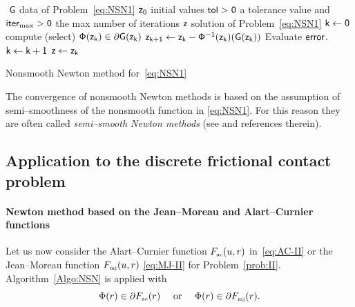 {\begin{algorithm}
  \begin{algorithmic}
    {\sf
      \STATE $ $
      \REQUIRE $\sf G $ data of Problem~\eqref{eq:NSN1}
      \REQUIRE $\sf z_0$ initial values
      \REQUIRE $\sf tol >0$ a tolerance value and $\sf iter_{\max}  >0$ the max number of iterations
      \ENSURE  $\sf z$ solution of Problem~\eqref{eq:NSN1}
      \STATE   $\sf k \leftarrow 0$ 
      \STATE compute (select) $\sf \Phi(z_k) \in \partial G(z_k)$
      \STATE $\sf z_{k+1} \leftarrow   z_k -  \Phi^{-1}(z_k) (G(z_k))$
      \STATE Evaluate $\sf error$.
      \STATE $\sf k \leftarrow k+1$
      \ENDWHILE
      \STATE $\sf z \leftarrow z_{k}$ 
    }
  \end{algorithmic}
  \caption{Nonsmooth Newton method for~\eqref{eq:NSN1}}  \label{Algo:NSN}
\end{algorithm}

The convergence of nonsmooth Newton methods is based on the assumption of semi--smoothness of the nonsmooth function in \eqref{eq:NSN1}.
For this reason they are often called \emph{semi--smooth Newton methods} (see \citep[Section 7.5]{Facchinei.Pang2003} and references therein).
\subsection{Application to  the discrete frictional contact problem}
\label{Sec:NSN-AC}


\paragraph{Newton method based on the Jean--Moreau and  Alart--Curnier functions}


Let us now consider the Alart--Curnier function $F_{{\hbox{\tiny{ac}}}}(u,r)$ in~\eqref{eq:AC-II} or the Jean--Moreau function $F_{{\hbox{\tiny{mj}}}}(u,r)$ \eqref{eq:MJ-II} for Problem~\ref{prob:II}. 
Algorithm~\ref{Algo:NSN} is applied with
\begin{equation}  \label{eq:phiphi-ac}
    \Phi(r) \in \partial F_{\actwo}(r)\quad\text{ or } \quad   \Phi(r) \in \partial F_{\mjtwo}(r).
\end{equation}}
